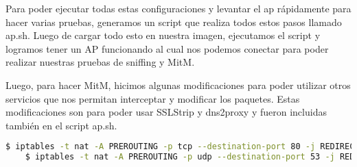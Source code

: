 Para poder ejecutar todas estas configuraciones y levantar el ap rápidamente para hacer varias pruebas, generamos un script que realiza todos estos pasos 
llamado ap.sh. Luego de cargar todo esto en nuestra imagen, ejecutamos el script y logramos tener un AP funcionando al cual nos podemos conectar para poder
realizar nuestras pruebas de sniffing y MitM.

Luego, para hacer MitM, hicimos algunas modificaciones para poder utilizar otros servicios que nos permitan interceptar y modificar los paquetes. Estas modificaciones 
son para poder usar SSLStrip y dns2proxy y fueron incluidas también en el script ap.sh.

\begin{lstlisting}[language=bash]
	$ iptables -t nat -A PREROUTING -p tcp --destination-port 80 -j REDIRECT --to-port 10000
	$ iptables -t nat -A PREROUTING -p udp --destination-port 53 -j REDIRECT --to-port 53	
\end{lstlisting}
